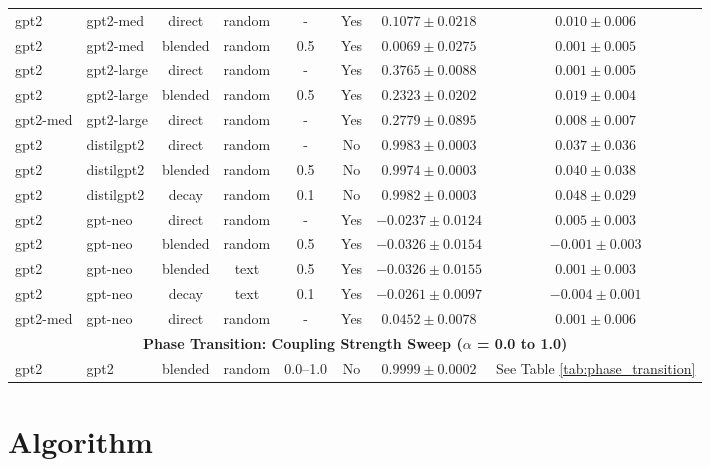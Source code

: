 \documentclass[10pt]{article} %
\theoremstyle{plain}
\theoremstyle{definition}
\theoremstyle{remark}
\begin{document}
\begin{table}[h!]
\begin{tabular}{llcccccc}
\midrule
gpt2 & gpt2-med & direct & random &  -  & Yes & $0.1077 \pm 0.0218$ & $0.010 \pm 0.006$ \\
gpt2 & gpt2-med & blended & random & 0.5 & Yes & $0.0069 \pm 0.0275$ & $0.001 \pm 0.005$ \\
gpt2 & gpt2-large & direct & random &  -  & Yes & $0.3765 \pm 0.0088$ & $0.001 \pm 0.005$ \\
gpt2 & gpt2-large & blended & random & 0.5 & Yes & $0.2323 \pm 0.0202$ & $0.019 \pm 0.004$ \\
gpt2-med & gpt2-large & direct & random &  -  & Yes & $0.2779 \pm 0.0895$ & $0.008 \pm 0.007$ \\
\midrule
gpt2 & distilgpt2 & direct & random &  -  & No & $0.9983 \pm 0.0003$ & $0.037 \pm 0.036$ \\
gpt2 & distilgpt2 & blended & random & 0.5 & No & $0.9974 \pm 0.0003$ & $0.040 \pm 0.038$ \\
gpt2 & distilgpt2 & decay & random & 0.1 & No & $0.9982 \pm 0.0003$ & $0.048 \pm 0.029$ \\
\midrule
gpt2 & gpt-neo & direct & random &  -  & Yes & $-0.0237 \pm 0.0124$ & $0.005 \pm 0.003$ \\
gpt2 & gpt-neo & blended & random & 0.5 & Yes & $-0.0326 \pm 0.0154$ & $-0.001 \pm 0.003$ \\
gpt2 & gpt-neo & blended & text & 0.5 & Yes & $-0.0326 \pm 0.0155$ & $0.001 \pm 0.003$ \\
gpt2 & gpt-neo & decay & text & 0.1 & Yes & $-0.0261 \pm 0.0097$ & $-0.004 \pm 0.001$ \\
gpt2-med & gpt-neo & direct & random &  -  & Yes & $0.0452 \pm 0.0078$ & $0.001 \pm 0.006$ \\
\midrule
\multicolumn{8}{c}{\textbf{Phase Transition: Coupling Strength Sweep ($\alpha$ = 0.0 to 1.0)}} \\
gpt2 & gpt2 & blended & random & 0.0--1.0 & No & $0.9999 \pm 0.0002$ & See Table \ref{tab:phase_transition} \\
\bottomrule
\end{tabular}
\end{table}

\section{Algorithm}
\end{document}
